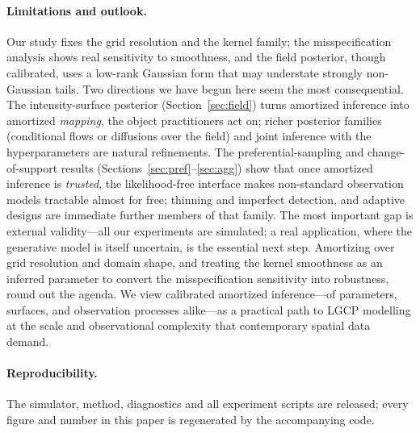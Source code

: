 \documentclass[11pt]{article}
\begin{document}
\paragraph{Limitations and outlook.}
Our study fixes the grid resolution and the kernel family; the misspecification
analysis shows real sensitivity to smoothness, and the field posterior, though
calibrated, uses a low-rank Gaussian form that may understate strongly
non-Gaussian tails. Two directions we have begun here seem the most consequential.
The intensity-surface posterior (Section~\ref{sec:field}) turns amortized
inference into amortized \emph{mapping}, the object practitioners act on; richer
posterior families (conditional flows or diffusions over the field) and joint
inference with the hyperparameters are natural refinements. The
preferential-sampling and change-of-support results
(Sections~\ref{sec:pref}--\ref{sec:agg}) show that once amortized inference is
\emph{trusted}, the likelihood-free interface makes non-standard observation
models tractable almost for free; thinning and imperfect detection, and adaptive
designs are immediate further members of that family. The most important gap is
external validity---all our experiments are simulated; a real application, where
the generative model is itself uncertain, is the essential next step. Amortizing
over grid resolution and domain shape, and
treating the kernel smoothness as an inferred parameter to convert the
misspecification sensitivity into robustness, round out the agenda. We view
calibrated amortized inference---of parameters, surfaces, and observation
processes alike---as a practical path to LGCP modelling at the scale and
observational complexity that contemporary spatial data demand.

\paragraph{Reproducibility.}
The simulator, method, diagnostics and all experiment scripts are released; every
figure and number in this paper is regenerated by the accompanying code.

\small


\end{document}
